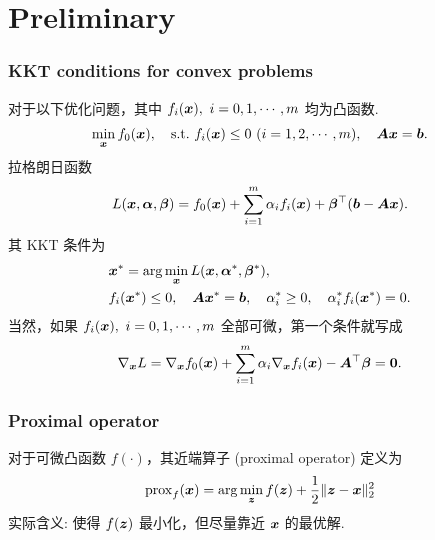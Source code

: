 \documentclass{beamer}
\begin{document}
\section{Preliminary}

\begin{frame}[fragile]
    \frametitle{KKT conditions for convex problems}
    对于以下优化问题，其中 $f_i({\bm x}),~i=0,1,\cdots,m$ 均为凸函数.
    \begin{align}
        \min_{{\bm x}}f_0({\bm x}),\quad\mathrm{s.t.}~ f_i({\bm x})\leq 0~(i=1,2,\cdots,m),\quad{\bm A}{\bm x}={\bm b}.
    \end{align}
    拉格朗日函数
    \begin{equation*}
        L({\bm x},{\bm\alpha},{\bm\beta})=f_0({\bm x})+\sum_{i=1}^m\alpha_if_i({\bm x})+{\bm\beta}^\top({\bm b}-{\bm A}{\bm x}).
    \end{equation*}
    其 KKT 条件为
    \begin{align}
        &{\bm x}^*=\arg\min_{{\bm x}}L({\bm x},{\bm\alpha}^*,{\bm\beta}^*),\\
        &f_i({\bm x}^*)\leq 0,\quad {\bm A}{\bm x}^*={\bm b},\quad\alpha_i^*\geq 0,\quad\alpha_i^*f_i({\bm x}^*)=0.
    \end{align}
    当然，如果 $f_i({\bm x}),~i=0,1,\cdots,m$ 全部可微，第一个条件就写成
    \begin{equation}
        \nabla_{{\bm x}} L=\nabla_{{\bm x}} f_0({\bm x})+\sum_{i=1}^m\alpha_i\nabla_{{\bm x}} f_i({\bm x}) -{\bm A}^\top{\bm\beta}=\bm0.
    \end{equation}
    \vspace{6pt}
\end{frame}

\begin{frame}[fragile]
    \frametitle{Proximal operator}
    对于可微凸函数 $f(\cdot)$，其近端算子 (proximal operator) 定义为
    \begin{equation*}
        \mathrm{prox}_f({\bm x})=\arg\min_{{\bm z}}f({\bm z})+\frac12\|{\bm z}-{\bm x}\|_2^2
    \end{equation*}
    实际含义: 使得 $f({\bm z})$ 最小化，但尽量靠近 ${\bm x}$ 的最优解.
\end{frame}
\end{document}
